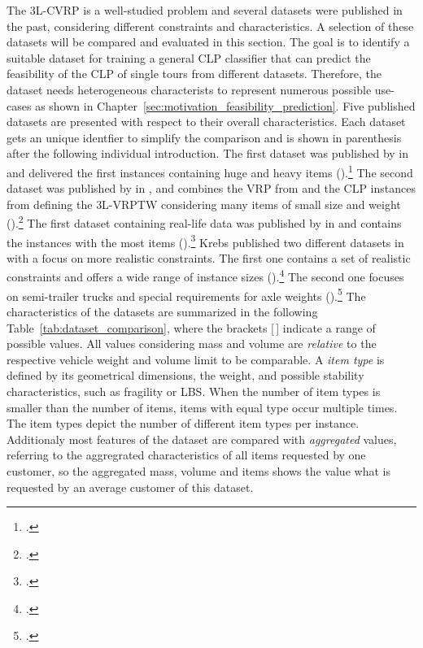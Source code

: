 The \gls{3L-CVRP} is a well-studied problem and several datasets were published in the past, considering
different constraints and characteristics. A selection of these datasets will be compared and evaluated
in this section. The goal is to identify a suitable dataset for training a general \gls{CLP} classifier that can predict
the feasibility of the \gls{CLP} of single tours from different datasets. Therefore, the dataset needs
heterogeneous characterists to represent numerous possible use-cases
as shown in Chapter~\ref{sec:motivation_feasibility_prediction}. Five published
 datasets are presented with respect to their overall characteristics.
Each dataset gets an unique identfier to simplify the comparison and is shown in parenthesis
after the following individual introduction. The first  dataset was published by \citeauthor{gendreau_tabu_2006} in
\citeyear{gendreau_tabu_2006} and delivered the first  instances containing huge and heavy items (\gendreauDataSet).\footcite[cf.][]{gendreau_tabu_2006}
The second dataset was published by \citeauthor{moura_integrated_2009} in \citeyear{moura_integrated_2009},
and combines the \gls{VRP} from \citeauthor{solomon_algorithms_1987} and the \gls{CLP} instances from
\citeauthor{bischoff_issues_1995} defining the \gls{3L-VRPTW} considering
many items of small size and weight (\mouraDataSet).\footcites[cf.][]{solomon_algorithms_1987,bischoff_issues_1995}[][]{moura_integrated_2009}
The first dataset containing real-life data was published by \citeauthor{ceschia_local_2013} in \citeyear{ceschia_local_2013}
and contains the instances with the most items (\ceschiaDataSet).\footcite[cf.][]{ceschia_local_2013}
Krebs published two different datasets in
\citeyear{krebs_advanced_2021} with a focus on more realistic constraints. The first one contains a set
of realistic constraints and offers a wide range of instance sizes (\krebsADataSet).\footcite[cf.][]{krebs_advanced_2021}
The second one focuses on semi-trailer trucks and special requirements for axle weights (\krebsBDataSet).\footcite[cf.][]{krebs_axle_2021}
The characteristics of the datasets are summarized in the following Table~\ref{tab:dataset_comparison},
where the brackets [\,] indicate a range of possible values. All values considering mass and volume are
\textit{relative} to the respective vehicle weight and volume limit to be comparable. A \textit{item type} is
defined by its geometrical dimensions, the weight, and possible stability characteristics, such as fragility or \gls{LBS}.
When the number of item types is smaller than the number of items, items with equal type occur multiple times. The item types
depict the number of different item types per instance. Additionaly
most features of the dataset are compared with \textit{aggregated}  values, referring to the aggregrated characteristics
of all items requested by one customer, so the aggregated mass, volume and items shows the value what is requested by an
average customer of this dataset.

